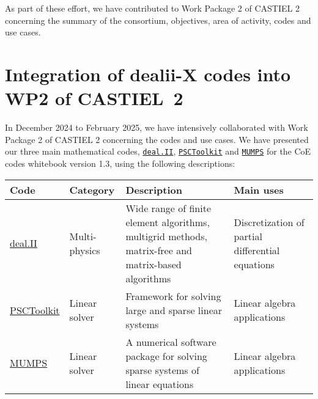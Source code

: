 \documentclass[a4paper,12pt]{article}
\begin{document}
As part of these effort, we have contributed to Work Package 2 of CASTIEL 2
concerning the summary of the consortium, objectives, area of activity, codes
and use cases.

\section{Integration of dealii-X codes into WP2 of CASTIEL~2}

In December 2024 to February 2025, we have intensively collaborated with Work
Package 2 of CASTIEL 2 concerning the codes and use cases. We have presented
our three main mathematical codes, \href{https://github.com/dealii/dealii}{\texttt{deal.II}}, \href{https://psctoolkit.github.io/libraries/}{\texttt{PSCToolkit}} and
\href{https://mumps-solver.org/index.php}{\texttt{MUMPS}} for the CoE codes whitebook version 1.3, using the following
descriptions:


{\small
  \noindent
  \renewcommand{\arraystretch}{2.5}
\begin{tabular}{llll}
  \hline
  \textbf{Code} & \textbf{Category} & \textbf{Description} & \textbf{Main uses} \\
  \hline
  \href{https://github.com/dealii/dealii}{deal.II} & \begin{minipage}{0.1\textwidth}Multi-physics\end{minipage} & \begin{minipage}{0.4\textwidth}
    Wide range of finite element algorithms, multigrid methods, matrix-free and matrix-based algorithms
  \end{minipage}
                                & \begin{minipage}{0.26\textwidth}Discretization of partial differential equations\end{minipage}
  \\
  \href{https://psctoolkit.github.io/libraries/}{PSCToolkit} & \begin{minipage}{0.1\textwidth}Linear solver\end{minipage} &\begin{minipage}{0.4\textwidth}
  Framework for solving large and sparse linear systems
  \end{minipage}
                                & \begin{minipage}{0.26\textwidth}Linear algebra applications\end{minipage}
  \\
  \href{https://mumps-solver.org/index.php}{MUMPS} & \begin{minipage}{0.1\textwidth}Linear solver\end{minipage} &\begin{minipage}{0.4\textwidth}
  A numerical software package for solving sparse systems of linear equations
  \end{minipage}
                                                           & \begin{minipage}{0.26\textwidth}Linear algebra applications\end{minipage}
  \\
  \hline
\end{tabular}
}
\end{document}
